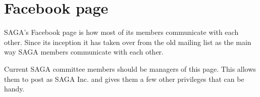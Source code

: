 \section{Facebook page}

SAGA's Facebook page is how most of its members communicate with each other. Since its inception it has taken over from the old mailing list as the main way SAGA members communicate with each other.

Current SAGA committee members should be managers of this page. This allows them to post as SAGA Inc. and gives them a few other privileges that can be handy.